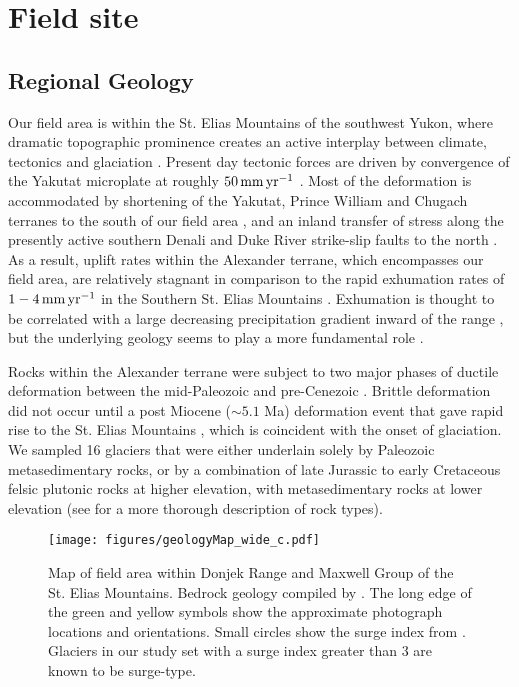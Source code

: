 \documentclass[draft,linenumbers]{agujournal}
\begin{document}
\section{Field site}

\subsection{Regional Geology}

Our field area is within the St. Elias Mountains of the southwest Yukon, where dramatic topographic prominence creates an active interplay between climate, tectonics and glaciation \citep[e.g.][]{Theberge1980}. Present day tectonic forces are driven by convergence of the Yakutat microplate at roughly $\rm 50\,mm\,yr^{-1}$ \citep[e.g.][]{Plafker1978,Fletcher2003,Elliott2013}. Most of the deformation is accommodated by shortening of the Yakutat, Prince William and Chugach terranes to the south of our field area \citep[e.g.][]{Worthington2008,Fletcher2003,Marechal2015}, and an inland transfer of stress along the presently active southern Denali and Duke River strike-slip faults to the north \citep[e.g.][]{Cobbett2016,Marechal2015}. As a result, uplift rates within the Alexander terrane, which encompasses our field area, are relatively stagnant \citep[e.g.][]{Berger2008,Dodds1988,Enkelmann2017} in comparison to the rapid exhumation rates of $\rm 1 - 4\,mm\,yr^{-1}$ in the Southern St. Elias Mountains \citep[e.g.][]{Berger2008,Enkelmann2008,OSullivan1997}. Exhumation is thought to be correlated with a large decreasing precipitation gradient inward of the range \citep[e.g.][]{Berger2008}, but the underlying geology seems to play a more fundamental role \citep{Enkelmann2017}.

Rocks within the Alexander terrane were subject to two major phases of ductile deformation between the mid-Paleozoic and pre-Cenezoic \citep[e.g.][]{Campbell1978,Israel2007,Cobbett2016}. Brittle deformation did not occur until a post Miocene ($\sim 5.1$ Ma) deformation event that gave rapid rise to the St. Elias Mountains \citep[e.g.][]{Eisbacher1977,Cobbett2016}, which is coincident with the onset of glaciation. We sampled 16 glaciers that were either underlain solely by Paleozoic metasedimentary rocks, or by a combination of late Jurassic to early Cretaceous felsic plutonic rocks at higher elevation, with metasedimentary rocks at lower elevation (see \cite{Crompton2016} for a more thorough description of rock types). 


\begin{figure}[H]
  \centering
  \texttt{[image: figures/geologyMap\_wide\_c.pdf]}
  \caption[]{Map of field area within Donjek Range and Maxwell Group of the St. Elias Mountains. Bedrock geology compiled by \cite{Gordey1999}. The long edge of the green and yellow symbols show the approximate photograph locations and orientations. Small circles show the surge index from \cite{Clarke1986}. Glaciers in our study set with a surge index greater than 3 are known to be surge-type.}
\label{map}
\end{figure}
\end{document}
